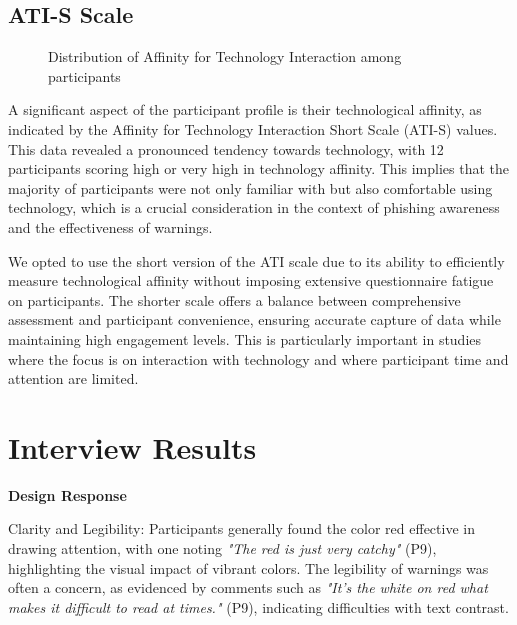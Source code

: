 \documentclass[
  a4paper,  %
  twoside,  %
  bibliography=totoc,
  headsepline,
  cleardoublepage=empty,
  parskip=half,
  draft=false
]{scrbook}
\begin{document}
\subsection{ATI-S Scale}

\begin{figure}[H]
\centering
{}
\caption{Distribution of Affinity for Technology Interaction among participants}
\label{ati}
\end{figure}

A significant aspect of the participant profile is their technological affinity, as indicated by the Affinity for Technology Interaction Short Scale (ATI-S) values. This data revealed a pronounced tendency towards technology, with 12 participants scoring high or very high in technology affinity. This implies that the majority of participants were not only familiar with but also comfortable using technology, which is a crucial consideration in the context of phishing awareness and the effectiveness of warnings.

We opted to use the short version of the ATI scale due to its ability to efficiently measure technological affinity without imposing extensive questionnaire fatigue on participants. The shorter scale offers a balance between comprehensive assessment and participant convenience, ensuring accurate capture of data while maintaining high engagement levels. This is particularly important in studies where the focus is on interaction with technology and where participant time and attention are limited.

\section{Interview Results}

\textbf{Design Response}

Clarity and Legibility: Participants generally found the color red effective in drawing attention, with one noting \textit{"The red is just very catchy"} (P9), highlighting the visual impact of vibrant colors. The legibility of warnings was often a concern, as evidenced by comments such as \textit{"It’s the white on red what makes it difficult to read at times."} (P9), indicating difficulties with text contrast. 
\end{document}
